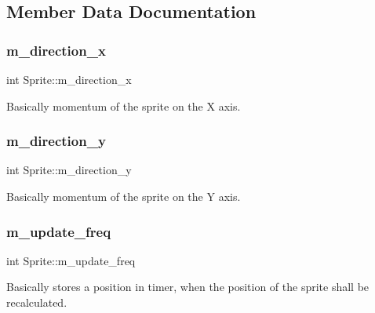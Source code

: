 \subsection{Member Data Documentation}
\mbox{\label{classSprite_ada1b4009e13a72b62fc139bb5f182a12}} 
\subsubsection{\texorpdfstring{m\+\_\+direction\+\_\+x}{m\_direction\_x}}
{\footnotesize\ttfamily int Sprite\+::m\+\_\+direction\+\_\+x\hspace{0.3cm}{\ttfamily [protected]}}



Basically momentum of the sprite on the X axis. 

\mbox{\label{classSprite_ab55aaafbb990f7d5c6f93b513dd5ce62}} 
\subsubsection{\texorpdfstring{m\+\_\+direction\+\_\+y}{m\_direction\_y}}
{\footnotesize\ttfamily int Sprite\+::m\+\_\+direction\+\_\+y\hspace{0.3cm}{\ttfamily [protected]}}



Basically momentum of the sprite on the Y axis. 

\mbox{\label{classSprite_adf17b6ade9cc7dffc1833bc6649b6a13}} 
\subsubsection{\texorpdfstring{m\+\_\+update\+\_\+freq}{m\_update\_freq}}
{\footnotesize\ttfamily int Sprite\+::m\+\_\+update\+\_\+freq\hspace{0.3cm}{\ttfamily [protected]}}



Basically stores a position in timer, when the position of the sprite shall be recalculated. 

